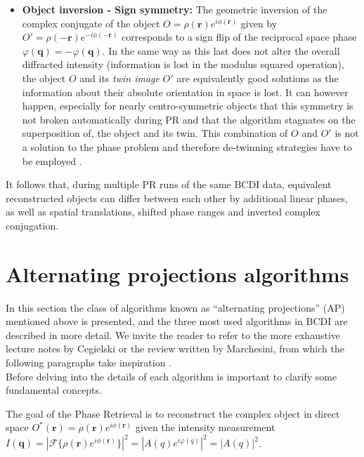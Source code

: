 \begin{itemize}
    \item \textbf{Object inversion - Sign symmetry:} The geometric inversion of the complex conjugate of the object 
    $ O = \rho(\mathbf{r})e^{i\phi({\mathbf{r}})}$ given by $O' = \rho(\mathbf{-r})e^{-i\phi({\mathbf{-r}})}$ corresponds to a 
    sign flip of the reciprocal space phase $\varphi(\mathbf{q}) = -\varphi(\mathbf{q})$. In the same way as this last 
    does not alter the overall diffracted intensity (information is lost in the modulus squared operation), the object $O$ 
    and its \textit{twin image} $O'$ are equivalently good solutions as the information about their absolute orientation 
    in space is lost. It can however happen, especially for nearly centro-symmetric objects 
    that this symmetry is not broken automatically during PR and that the algorithm stagnates on the superposition of, 
    the object and its twin. This combination of $O$ and $ O'$ is not a solution to the phase problem \cite{guizar-sicairos_understanding_2012} 
    and therefore de-twinning strategies have to be employed \cite{Gaur2015}. 
    
\end{itemize}

It follows that, during multiple PR runs of the same BCDI data, equivalent reconstructed objects can differ between each 
other by additional linear phases, as well as spatial translations, shifted phase ranges and inverted complex conjugation. 


\section{Alternating projections algorithms}

In this section the class of algorithms known as ``alternating projections'' (AP) mentioned above is presented, and the three most 
used algorithms in BCDI are described in more detail. We invite the reader to refer to the more exhaustive lecture notes by 
Cegielski \cite{book_iterative2012} or the review written by Marchesini, from which the following paragraphs take 
inspiration \cite{marchesini_unified_2007} .\\

Before delving into the details of each algorithm is important to clarify some fundamental concepts.

The goal of the Phase Retrieval is to reconstruct the complex object in direct space $O^{\ast}(\mathbf{r}) = \rho(\mathbf{r})e^{i\phi(\mathbf{r})}$
given the intensity measurement $I(\mathbf{q}) = |\mathcal{F}\{\rho(\mathbf{r})e^{i\phi(\mathbf{r})}\}|^2 = |A(q)e^{i\varphi(q)}|^2 = |A(q)|^2 $. 

